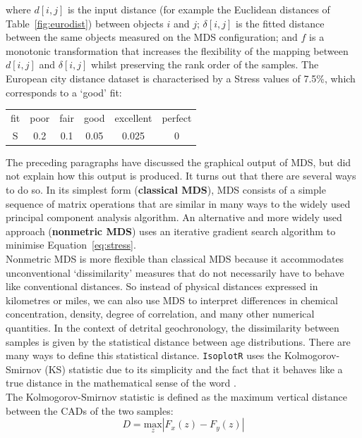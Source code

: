 \begin{refsection}
\noindent where $d[i,j]$ is the input distance (for example the
Euclidean distances of Table~\ref{fig:eurodist}) between objects $i$
and $j$; $\delta[i,j]$ is the fitted distance between the same objects
measured on the MDS configuration; and $f$ is a monotonic
transformation that increases the flexibility of the mapping between
$d[i,j]$ and $\delta[i,j]$ whilst preserving the rank order of the
samples.  The European city distance dataset is characterised by a
Stress values of 7.5\%, which corresponds to a `good' fit:
\begin{center}
  \begin{tabular}{c|ccccc}
    fit & poor & fair & good & excellent & perfect \\
    S & 0.2 & 0.1 & 0.05 & 0.025 & 0
  \end{tabular}
  \label{tab:S}
\end{center}

The preceding paragraphs have discussed the graphical output of MDS,
but did not explain how this output is produced. It turns out that
there are several ways to do so. In its simplest form
(\textbf{classical MDS}), MDS consists of a simple sequence of matrix
operations that are similar in many ways to the widely used principal
component analysis algorithm. An alternative and more widely used
approach (\textbf{nonmetric MDS}) uses an iterative gradient search
algorithm to minimise Equation~\ref{eq:stress}.\\

Nonmetric MDS is more flexible than classical MDS because it
accommodates unconventional `dissimilarity' measures that do not
necessarily have to behave like conventional distances. So instead of
physical distances expressed in kilometres or miles, we can also use
MDS to interpret differences in chemical concentration, density,
degree of correlation, and many other numerical quantities.  In the
context of detrital geochronology, the dissimilarity between samples
is given by the statistical distance between age distributions. There
are many ways to define this statistical distance. \texttt{IsoplotR}
uses the Kolmogorov-Smirnov (KS) statistic due to its simplicity and
the fact that it behaves like a true distance in the mathematical
sense of the word \citep{vermeesch2013, vermeesch2018b}.\\

The Kolmogorov-Smirnov statistic is defined as the maximum vertical
distance between the CADs of the two samples:
\begin{equation}
  D = \underset{z}{\mbox{max}} |F_x(z) - F_y(z)|
  \label{eq:KS}
\end{equation}


\end{refsection}
